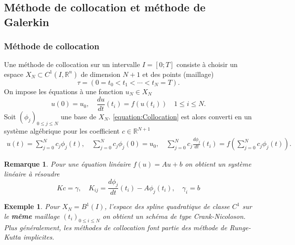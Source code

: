 \documentclass[11pt,a4paper]{article}
\newcommand{\R}{\mathbb R}
\newtheorem{remark}[theorem]{Remarque}
\newtheorem{example}[theorem]{Exemple}
\begin{document}
\subsection{Méthode de collocation et méthode de Galerkin}\label{subsec:}
%
\subsubsection{Méthode de collocation}

Une méthode de collocation sur un intervalle $I=[0;T]$ consiste à choisir un espace $X_N\subset C^1(I,\R^n)$ de dimension $N+1$ et des points (maillage)
%
\begin{equation}\label{equation:Mesh}
\tau = \left( 0 = t_0 < t_1 < \cdots < t_N = T\right).
\end{equation}
%
On impose les équations à une fonction $u_N\in X_N$
%
\begin{equation}\label{equation:Collocation}
u(0) = u_0,\quad \frac{du}{dt}(t_i) = f(u(t_i))\quad 1\le i\le N.
\end{equation}
%
Soit $(\phi_j)_{0\le j\le N}$ une base de $X_N$. \eqref{equation:Collocation} est alors converti en un système algébrique pour les coefficient $c\in\R^{N+1}$
\begin{align*}
u(t) = \sum_{j=0}^N c_j \phi_j(t),\quad \sum_{j=0}^N c_j \phi_j(0) = u_0,\quad \sum_{j=0}^N c_j\frac{d\phi_j}{dt}(t_i) = f(\sum_{j=0}^N c_j \phi_j(t)).
\end{align*}
%
%
\begin{remark}\label{remark:}
Pour une équation linéaire $f(u)=A u + b$ on obtient un système linéaire à résoudre
%
\begin{equation}\label{equation:}
K c = \gamma,\quad K_{ij} = \frac{d\phi_j}{dt}(t_i) - A\phi_j(t_i),\quad \gamma_i = b 
\end{equation}
%
\end{remark}
%
%
\begin{example}\label{example:}
Pour $X_N = B^1(I)$, l'espace des spline quadratique de classe $C^1$ sur le \textbf{même} maillage $(t_i)_{0\le i\le N}$ on obtient un schéma de type Crank-Nicoloson. Plus généralement, les méthodes de collocation font partie des méthode de Runge-Kutta implicites.
\end{example}
%
%
\end{document}

